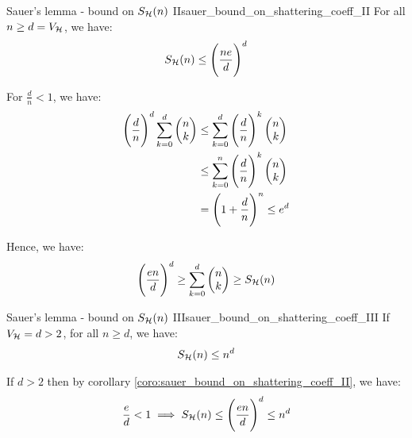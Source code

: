 \begin{corollary}{Sauer's lemma - bound on $S_{\mathcal{H}}(n)$ II}{sauer_bound_on_shattering_coeff_II}
    For all $n\ge d=V_{\mathcal{H}}$, we have:
    \begin{align*}
        S_{\mathcal{H}}(n) \le \Bigg( 
            \frac{ne}{d}
         \Bigg)^d
    \end{align*}
\end{corollary}

\begin{proof*}
    For $\frac{d}{n} < 1$, we have:
    \begin{align*}
        \Bigg( \frac{d}{n} \Bigg)^d \sum_{k=0}^d \begin{pmatrix}
            n \\ k
        \end{pmatrix} &\le \sum_{k=0}^d \Bigg( \frac{d}{n} \Bigg)^k \begin{pmatrix}
            n \\ k
        \end{pmatrix} \\
        &\le \sum_{k=0}^n \Bigg( \frac{d}{n} \Bigg)^k \begin{pmatrix}
            n \\ k 
        \end{pmatrix} \\
        &= \Bigg( 1 + \frac{d}{n} \Bigg)^n \le e^d
    \end{align*}

    \noindent Hence, we have:
    \begin{align*}
        \Bigg( \frac{en}{d} \Bigg)^d \ge \sum_{k=0}^d \begin{pmatrix}
            n \\ k
        \end{pmatrix} \ge S_{\mathcal{H}}(n)
    \end{align*}
\end{proof*}

\begin{corollary}{Sauer's lemma - bound on $S_{\mathcal{H}}(n)$ III}{sauer_bound_on_shattering_coeff_III}
    If $V_{\mathcal{H}}=d>2$, for all $n\ge d$, we have:
    \begin{align*}
        S_{\mathcal{H}}(n) \le n^d
    \end{align*}
\end{corollary}

\begin{proof*}
    If $d>2$ then by corollary \ref{coro:sauer_bound_on_shattering_coeff_II}, we have:
    \begin{align*}
        \frac{e}{d} < 1 \implies S_{\mathcal{H}}(n) \le \Bigg( \frac{en}{d} \Bigg)^d \le n^d
    \end{align*}
\end{proof*}

